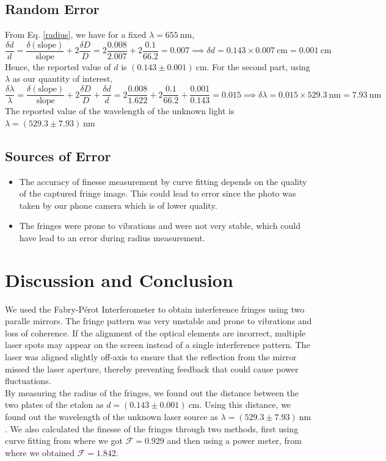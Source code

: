 \documentclass[usenames, svgnames, dvipsnames]{scrartcl}
\begin{document}
\subsection{Random Error}
From Eq. \eqref{radius}, we have for a fixed $\lambda = 655 \ \text{nm}$,
$$\frac{\delta d}{d} =  \frac{\delta (\text{slope})}{\text{slope}}+2\frac{\delta D}{D}=2 \frac{0.008}{2.007}+ 2\frac{0.1}{66.2} =0.007 \implies \delta d = 0.143\times 0.007 \ \text{cm} = 0.001 \ \text{cm}$$
Hence, the reported value of $d$ is $(0.143\pm 0.001) \ \text{cm}$. For the second part, using $\lambda$ as our quantity of interest, 
$$\frac{\delta \lambda}{\lambda} = \frac{\delta (\text{slope})}{\text{slope}}+2\frac{\delta D}{D}+\frac{\delta d}{d} = 2 \frac{0.008}{1.622}+ 2\frac{0.1}{66.2}+\frac{0.001}{0.143} =0.015\implies \delta \lambda = 0.015\times 529.3 \ \text{nm} = 7.93\ \text{nm}$$
The reported value of the wavelength of the unknown light is $\lambda = (529.3 \pm 7.93)\ \text{nm}$
\subsection{Sources of Error}
\begin{itemize}
    \item The accuracy of finesse measurement by curve fitting depends on the quality of the captured fringe image. This could lead to error since the photo was taken by our phone camera which is of lower quality.
    \item The fringes were prone to vibrations and were not very stable, which could have lead to an error during radius measurement.
\end{itemize}
\section{Discussion and Conclusion}
We used the Fabry-P\'erot Interferometer to obtain interference fringes using two paralle mirrors. The fringe pattern was very unstable and prone to vibrations and loss of coherence. If the alignment of the optical elements are incorrect, multiple laser spots may appear on the screen instead of a single interference pattern.
The laser was aligned slightly off-axis to ensure that the reflection from the mirror missed the laser aperture, thereby preventing feedback that could cause power fluctuations.\\[0.2cm]
By measuring the radius of the fringes, we found out the distance between the two plates of the etalon as $d=(0.143 \pm 0.001) \ \text{cm}$. Using this distance, we found out the wavelength of the unknown laser source as $\lambda = (529.3 \pm 7.93)\ \text{nm}$. We also calculated the finesse of the fringes through two methods, first using curve fitting from where we got $\mathscr{F} = 0.929$ and then using a power meter, from where we obtained $\mathscr{F} = 1.842$.
\end{document}
